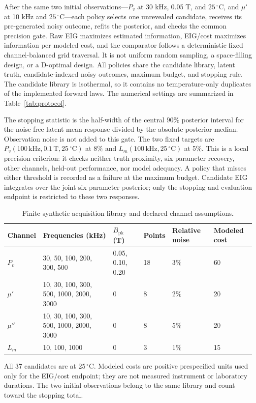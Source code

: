 \documentclass[10pt,a4paper,twocolumn]{article}
\makeatletter
\renewcommand\subsection{\@startsection{subsection}{2}{0pt}{1ex plus .2ex}{.35ex}{\normalsize\bfseries}}
\makeatother
\begin{document}
\subsection{Paired sequential policy}
After the same two initial observations---$P_v$ at 30 kHz, 0.05 T, and
$25\,^{\circ}\mathrm C$, and $\mu'$ at 10 kHz and $25\,^{\circ}\mathrm C$---each
policy selects one unrevealed candidate, receives its pre-generated noisy
outcome, refits the posterior, and checks the common precision gate. Raw EIG
maximizes estimated information, EIG/cost maximizes information per modeled
cost, and the comparator follows a deterministic fixed channel-balanced grid
traversal. It is not uniform random sampling, a space-filling design, or a
D-optimal design. All policies share the candidate library, latent truth,
candidate-indexed noisy outcomes, maximum budget, and stopping rule. The
candidate library is isothermal, so it contains no temperature-only duplicates
of the implemented forward laws.
The numerical settings are summarized in Table~\ref{tab:protocol}.

The stopping statistic is the half-width of the central 90\% posterior interval
for the noise-free latent mean response divided by the absolute posterior
median. Observation noise is not added to this gate. The two fixed targets are
$P_v(100\,\mathrm{kHz},0.1\,\mathrm T,25\,^{\circ}\mathrm C)$ at 8\% and
$L_m(100\,\mathrm{kHz},25\,^{\circ}\mathrm C)$ at 5\%. This is a local precision
criterion: it checks neither truth proximity, six-parameter recovery, other
channels, held-out performance, nor model adequacy. A policy that misses either
threshold is recorded as a failure at the maximum budget. Candidate EIG
integrates over the joint six-parameter posterior; only the stopping and
evaluation endpoint is restricted to these two responses.

\begin{table}[t]
\caption{Finite synthetic acquisition library and declared channel assumptions.}
\label{tab:candidate-library}
\centering\small
\begin{tabular}{@{}llllll@{}}
\toprule
Channel & Frequencies (kHz) & $B_{\mathrm{pk}}$ (T) & Points & Relative noise & Modeled cost \\
\midrule
$P_v$ & 30, 50, 100, 200, 300, 500 & 0.05, 0.10, 0.20 & 18 & 3\% & 60 \\
$\mu'$ & 10, 30, 100, 300, 500, 1000, 2000, 3000 & 0 & 8 & 2\% & 20 \\
$\mu''$ & 10, 30, 100, 300, 500, 1000, 2000, 3000 & 0 & 8 & 5\% & 20 \\
$L_m$ & 10, 100, 1000 & 0 & 3 & 1\% & 15 \\
\bottomrule
\end{tabular}
\begin{minipage}{0.96\textwidth}\footnotesize
All 37 candidates are at $25\,^{\circ}\mathrm C$. Modeled costs are positive
prespecified units used only for the EIG/cost endpoint; they are not measured
instrument or laboratory durations. The two initial observations belong to
the same library and count toward the stopping total.
\end{minipage}
\end{table}
\end{document}
